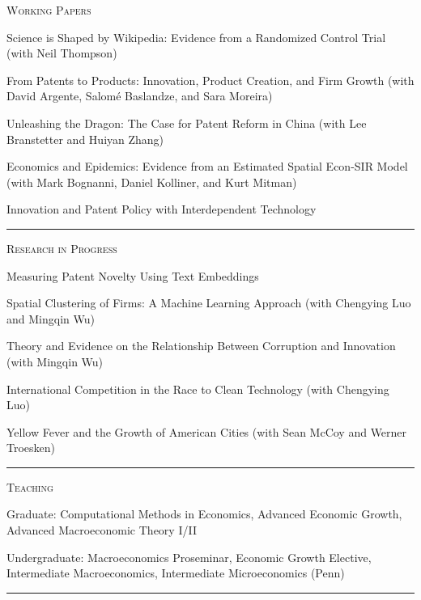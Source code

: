 \documentclass{article}
\begin{document}
\parbox{\textwidth}{
\parbox[t]{0.28\textwidth}{ \raggedright \noindent \textsc{ Working Papers } }
\parbox[t]{0.72\textwidth}{ \raggedright

Science is Shaped by Wikipedia: Evidence from a Randomized Control Trial (with Neil Thompson)
\vspace{0.27cm}

From Patents to Products: Innovation, Product Creation, and Firm Growth (with David Argente, Salomé Baslandze, and Sara Moreira)
\vspace{0.27cm}

Unleashing the Dragon: The Case for Patent Reform in China (with Lee Branstetter and Huiyan Zhang)
\vspace{0.27cm}

Economics and Epidemics: Evidence from an Estimated Spatial Econ-SIR Model (with Mark Bognanni, Daniel Kolliner, and Kurt Mitman)
\vspace{0.27cm}

Innovation and Patent Policy with Interdependent Technology
\vspace{0.27cm}

}
\textcolor{light-gray}{\hrule}
}
\vspace{0.3cm}

\parbox{\textwidth}{
\parbox[t]{0.28\textwidth}{ \raggedright \noindent \textsc{ Research in Progress } }
\parbox[t]{0.72\textwidth}{ \raggedright

Measuring Patent Novelty Using Text Embeddings
\vspace{0.27cm}

Spatial Clustering of Firms: A Machine Learning Approach (with Chengying Luo and Mingqin Wu)
\vspace{0.27cm}

Theory and Evidence on the Relationship Between Corruption and Innovation (with Mingqin Wu)
\vspace{0.27cm}

International Competition in the Race to Clean Technology (with Chengying Luo)
\vspace{0.27cm}

Yellow Fever and the Growth of American Cities (with Sean McCoy and Werner Troesken)
\vspace{0.27cm}

}
\textcolor{light-gray}{\hrule}
}
\vspace{0.3cm}

\parbox{\textwidth}{
\parbox[t]{0.28\textwidth}{ \raggedright \noindent \textsc{ Teaching } }
\parbox[t]{0.72\textwidth}{ \raggedright

Graduate: Computational Methods in Economics, Advanced Economic Growth, Advanced Macroeconomic Theory I/II
\vspace{0.27cm}

Undergraduate: Macroeconomics Proseminar, Economic Growth Elective, Intermediate Macroeconomics, Intermediate Microeconomics (Penn)
\vspace{0.27cm}

}
\textcolor{light-gray}{\hrule}
}
\vspace{0.3cm}
\end{document}
